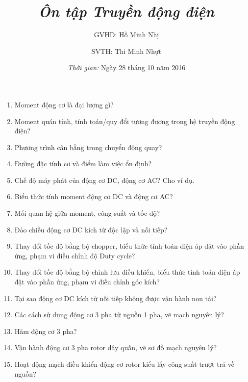 \documentclass[12pt,a4paper]{article}
\begin{document}
\title{\textbf{\textit{Ôn tập Truyền động điện}}}
\author{GVHD: Hồ Minh Nhị \and SVTH: Thi Minh Nhựt}
\date{\textit{Thời gian:} Ngày 28 tháng 10 năm 2016}
\maketitle
\begin{enumerate}
	\item Moment động cơ là đại lượng gì?
	
	\item Moment quán tính, tính toán/quy đổi tương đương trong hệ truyền động điện?
	
	\item Phương trình cân bằng trong chuyển động quay?
	
	\item Đường đặc tính cơ và điểm làm việc ổn định?
	
	\item Chế độ máy phát của động cơ DC, động cơ AC? Cho ví dụ.
	
	\item Biểu thức tính moment động cơ DC và động cơ AC?
	
	\item Mối quan hệ giữa moment, công suất và tốc độ?
	
	\item Đảo chiều động cơ DC kích từ độc lập và nối tiếp?
	
	\item Thay đổi tốc độ bằng bộ chopper, biểu thức tính toán điện áp đặt vào phần ứng, phạm vi điều chỉnh độ Duty cycle?
	
	\item Thay đổi tốc độ bằng bộ chỉnh lưu điều khiển, biểu thức tính toán điện áp đặt vào phần ứng, phạm vi điều chỉnh góc kích?
	
	\item Tại sao động cơ DC kích từ nối tiếp không được vận hành non tải?
	
	\item Các cách sử dụng động cơ 3 pha từ nguồn 1 pha, vẽ mạch nguyên lý?
	
	\item Hãm động cơ 3 pha?
	
	\item Vận hành động cơ 3 pha rotor dây quấn, vẽ sơ đồ mạch nguyên lý?
	
	\item Hoạt động mạch điều khiển động cơ rotor kiểu lấy công suất trượt trả về nguồn?


\end{enumerate}
\end{document}

